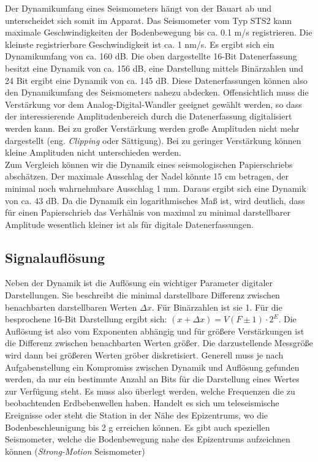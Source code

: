 Der Dynamikumfang eines Seismometers hängt von der Bauart ab und unterscheidet sich somit im Apparat. Das Seismometer vom Typ STS2 kann maximale Geschwindigkeiten der Bodenbewegung bis ca. 0.1 m/s registrieren. Die kleinste registrierbare Geschwindigkeit ist ca. 1 nm/s. Es ergibt sich ein Dynamikumfang von ca. 160 dB. Die oben dargestellte 16-Bit Datenerfassung besitzt eine Dynamik von ca. 156 dB, eine Darstellung mittels Binärzahlen und 24 Bit ergibt eine Dynamik von ca. 145 dB. Diese Datenerfassungen können also den Dynamikumfang des Seismometers nahezu abdecken. Offensichtlich muss die Verstärkung vor dem Analog-Digital-Wandler geeignet gewählt werden, so dass der interessierende Amplitudenbereich durch die Datenerfassung digitalisiert werden kann. Bei zu großer Verstärkung werden große Amplituden nicht mehr dargestellt (eng. \textsl{Clipping} oder Sättigung).  Bei zu geringer Verstärkung können kleine Amplituden nicht unterschieden werden. \\

Zum Vergleich können wir die Dynamik eines seismologischen Papierschriebs abschätzen. Der maximale Ausschlag der Nadel könnte 15 cm betragen, der minimal noch wahrnehmbare Ausschlag 1 mm. Daraus ergibt sich eine Dynamik von ca. 43 dB. Da die Dynamik ein logarithmisches Maß ist, wird deutlich, dass für einen Papierschrieb das Verhälnis von maximal zu minimal darstellbarer Amplitude wesentlich kleiner ist als für digitale Datenerfassungen. 
 

\subsection{Signalauflösung} 
Neben der Dynamik ist die Auflösung ein wichtiger Parameter digitaler Darstellungen. Sie beschreibt die minimal darstellbare Differenz zwischen benachbarten darstellbaren Werten $\Delta x$. Für Binärzahlen ist sie 1. Für die besprochene 16-Bit Darstellung ergibt sich: $(x + \Delta x)= V( F\pm 1)\cdot 2^E$. Die Auflösung ist also vom Exponenten abhängig und für größere Verstärkungen ist die Differenz zwischen benachbarten Werten größer. Die darzustellende Messgröße wird dann bei größeren Werten gröber diskretisiert. Generell muss je nach Aufgabenstellung ein Kompromiss zwischen Dynamik und Auflösung gefunden werden, da nur ein bestimmte Anzahl an Bits für die Darstellung eines Wertes zur Verfügung steht. Es muss also überlegt werden, welche Frequenzen die zu beobachtenden Erdbebenwellen haben. Handelt es sich um teleseismische Ereignisse oder steht die Station in der Nähe des Epizentrums, wo die Bodenbeschleunigung bis 2 g erreichen können. Es gibt auch speziellen Seismometer, welche die Bodenbewegung nahe des Epizentrums aufzeichnen können (\textsl{Strong-Motion} Seismometer)

